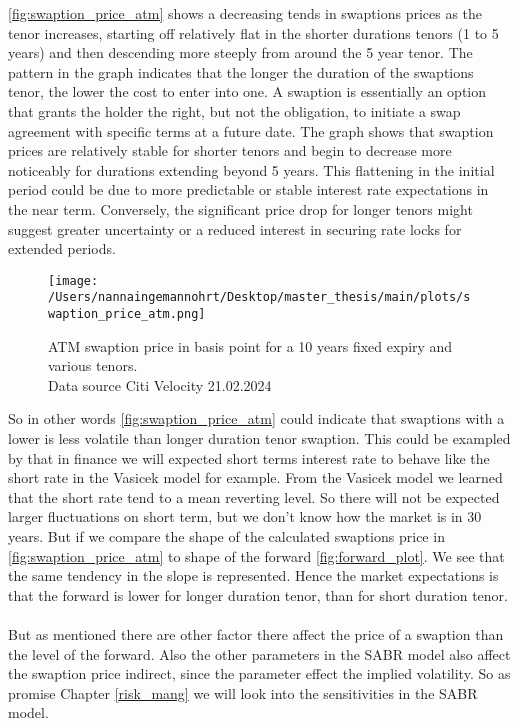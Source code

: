 \noindent
\autoref{fig:swaption_price_atm} shows a decreasing tends in swaptions prices as the tenor increases,
starting off relatively flat in the shorter durations tenors (1 to 5 years) and then 
descending more steeply from around the 5 year tenor. 
The pattern in the graph indicates that the longer the duration of the swaptions tenor, 
the lower the cost to enter into one. A swaption is essentially an option that grants the 
holder the right, but not the obligation, to initiate a swap agreement with specific terms at a future date. 
The graph shows that swaption prices are relatively stable for shorter tenors and begin to 
decrease more noticeably for durations extending beyond 5 years. 
This flattening in the initial period could be due to more predictable or stable interest 
rate expectations in the near term. Conversely, the significant price drop for longer 
tenors might suggest greater uncertainty or a reduced interest in securing rate locks for extended periods.
\begin{figure}[H]
    \centering
    \texttt{[image: /Users/nannaingemannohrt/Desktop/master\_thesis/main/plots/swaption\_price\_atm.png]}
    \caption{ATM swaption price in basis point for a 10 years fixed expiry and various tenors.
    \\ Data source  Citi Velocity 21.02.2024}
    \label{fig:swaption_price_atm}
\end{figure}
\noindent
So in other words \autoref{fig:swaption_price_atm}  could indicate that swaptions with a lower is less
volatile than longer duration tenor swaption. This could be exampled by that in finance we will 
expected short terms interest rate to behave like the short rate in the Vasicek model for example. 
From the Vasicek model we learned that the short rate tend to a mean reverting level. 
So there will not be expected larger fluctuations on short term, but we don't know how the market is in 
30 years. But if we compare the shape of the calculated swaptions price in \autoref{fig:swaption_price_atm} 
to shape of the forward \autoref{fig:forward_plot}. We see that the same tendency in the slope 
is represented. Hence the market expectations is that the forward is lower for longer duration tenor, 
than for short duration tenor. 
\\\\
But as mentioned there are other factor there affect the price of a swaption than the level of the forward. 
Also the other parameters in the SABR model also affect the swaption price indirect, 
since the parameter effect the implied volatility. 
So as promise Chapter \ref{risk_mang} we will look into the sensitivities in the SABR model.
